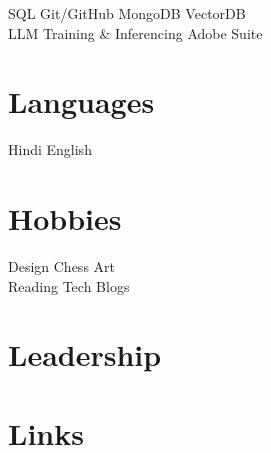 \documentclass[]{deedy-resume-openfont}
\begin{document}
\begin{minipage}[t]{0.33\textwidth}
SQL \textbullet{} Git/GitHub \textbullet{} MongoDB \textbullet{} VectorDB \\

LLM Training \& Inferencing \textbullet{} Adobe Suite \\

\sectionsep



\section{Languages}

Hindi \textbullet{} English

\sectionsep



\section{Hobbies}

Design \textbullet{} Chess \textbullet{} Art \\

Reading Tech Blogs

\sectionsep











\section{Leadership}




\sectionsep






\sectionsep









\section{Links} 


\end{minipage}
\end{document}

